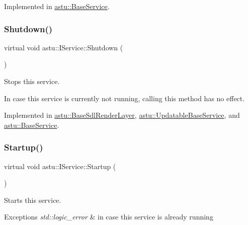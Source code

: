 Implemented in \hyperlink{classastu_1_1BaseService_af6f4641c045343d329a0fc1ecc6a9778}{astu\+::\+Base\+Service}.

\mbox{\label{classastu_1_1IService_a67643385e7cc17c31e0b3b49672b5856}} 
\subsubsection{\texorpdfstring{Shutdown()}{Shutdown()}}
{\footnotesize\ttfamily virtual void astu\+::\+I\+Service\+::\+Shutdown (\begin{DoxyParamCaption}{ }\end{DoxyParamCaption})\hspace{0.3cm}{\ttfamily [pure virtual]}}

Stops this service.

In case this service is currently not running, calling this method has no effect. 

Implemented in \hyperlink{classastu_1_1BaseSdlRenderLayer_a786ae49f41873d498ae0d22a0f3a5349}{astu\+::\+Base\+Sdl\+Render\+Layer}, \hyperlink{classastu_1_1UpdatableBaseService_a7ad7e0201007878b6014361dd5ba82f9}{astu\+::\+Updatable\+Base\+Service}, and \hyperlink{classastu_1_1BaseService_a7095888244052db294d58738c0d187fb}{astu\+::\+Base\+Service}.

\mbox{\label{classastu_1_1IService_a7a09e485d116659f174aca9a8494fa55}} 
\subsubsection{\texorpdfstring{Startup()}{Startup()}}
{\footnotesize\ttfamily virtual void astu\+::\+I\+Service\+::\+Startup (\begin{DoxyParamCaption}{ }\end{DoxyParamCaption})\hspace{0.3cm}{\ttfamily [pure virtual]}}

Starts this service.


\begin{DoxyExceptions}{Exceptions}
{\em std\+::logic\+\_\+error} & in case this service is already running \\
\hline
\end{DoxyExceptions}


